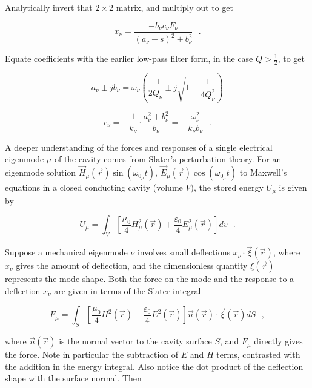 \documentclass[a4paper,12pt]{article}
\begin{document}
\noindent Analytically invert that $2\times 2$ matrix, and multiply out to get

\begin{equation}
x_{\nu} = \frac{-b_{\nu}c_{\nu}F_{\nu}}{ (a_{\nu}-s)^2 + b_{\nu}^2}~~~.
\end{equation}

\noindent Equate coefficients with the earlier low-pass filter form, in the case $Q > \frac{1}{2}$, to get

\begin{equation}
a_{\nu}\pm jb_{\nu} = \omega_{\nu}\left( \frac{-1}{2Q_{\nu}} \pm j\sqrt{1-\frac{1}{4Q_{\nu}^2}}\right)
\end{equation}

\begin{equation}
c_{\nu} = -\frac{1}{k_{\nu}}\cdot\frac{a_{\nu}^2+b_{\nu}^2 }{ b_{\nu}} = - \frac{\omega_{\nu}^2}{k_{\nu} b_{\nu}}~~~.
\end{equation}

A deeper understanding of the forces and responses of a single electrical eigenmode $\mu$ of the cavity comes from Slater's perturbation theory.  For an eigenmode solution $\vec H_{\mu}(\vec r)\sin(\omega_{0_{\mu}} t)$, $\vec E_{\mu}(\vec r)\cos(\omega_{0_{\mu}} t)$ to Maxwell's equations in a closed conducting cavity (volume $V$), the stored energy $U_{\mu}$ is given by

\begin{equation}
U_{\mu} = \int_V \left[ \frac{\mu_0}{4}H_{\mu}^2(\vec r)
        +  \frac{\varepsilon_0}{4}E_{\mu}^2(\vec r) \right] dv~~~.
\end{equation}

Suppose a mechanical eigenmode $\nu$ involves small deflections $x_{\nu}\cdot \vec\xi(\vec r)$, where $x_{\nu}$ gives the amount of deflection, and the dimensionless quantity $\xi(\vec r)$ represents the mode shape. Both the force on the mode and the response to a deflection $x_{\nu}$ are given in terms of the Slater integral

\begin{equation}
 F_{\mu}  = \int_S \left[ \frac{\mu_0}{ 4}H^2(\vec r)
          -  \frac{\varepsilon_0}{ 4}E^2(\vec r) \right]
          \vec n(\vec r) \cdot \vec\xi(\vec r) dS ~~~,
\end{equation}

\noindent where $\vec n(\vec r)$ is the normal vector to the cavity surface $S$, and $F_{\mu}$ directly gives the force. Note in particular the subtraction of $E$ and $H$ terms, contrasted with the addition in the energy integral.  Also notice the dot product of the deflection shape with the surface normal.  Then
\end{document}

